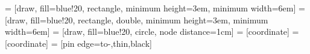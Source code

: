 
\usepackage{tikz}
\usetikzlibrary{shapes,arrows}

 = [draw, fill=blue!20, rectangle, minimum height=3em, minimum width=6em]
    = [draw, fill=blue!20, rectangle, double, minimum height=3em, minimum width=6em]
   = [draw, fill=blue!20, circle, node distance=1cm]
    = [coordinate]
   = [coordinate]
   = [pin edge={to-,thin,black}]
